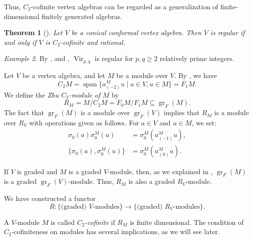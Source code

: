 \documentclass[a4paper, 12pt, reqno]{amsart}
\newtheorem{theorem}{Theorem}[section]
\theoremstyle{remark}
\newtheorem{example}[theorem]{Example}
\DeclareMathOperator{\Vir}{Vir}
\DeclareMathOperator{\gr}{gr}
\DeclareMathOperator{\vspan}{span}
\begin{document}
Thus, $C_2$-cofinite vertex algebras can be regarded as a generalization of finite-dimensional finitely generated algebras.

\begin{theorem}[{\cite[Theorem 4.5]{abe_rationality_2003}}]
  \label{thr:57}
  Let $V$ be a conical conformal vertex algebra.
  Then $V$ is regular if and only if $V$ is $C_2$-cofinite and rational.
\end{theorem}

\begin{example}
  \label{exa:20}
  By ,  and , $\Vir_{p, q}$ is regular for $p, q \ge 2$ relatively prime integers.
\end{example}

Let $V$ be a vertex algebra, and let $M$ be a module over $V$.
By , we have
\begin{equation*}
  C_2M = \vspan\{a^M_{(-2)}u \mid a \in V, u \in M\} = F_1M.
\end{equation*}
We define the \emph{Zhu $C_2$-module of $M$} by
\begin{equation*}
  R_M = M/C_2M = F_0M/F_1M \subseteq \gr_F(M).
\end{equation*}
The fact that $\gr_F(M)$ is a module over $\gr_F(V)$ implies that $R_M$ is a module over $R_V$ with operations given as follows.
For $a \in V$ and $u \in M$, we set:
\begin{align*}
  \sigma_0(a)\sigma^M_0(u) &= \sigma^M_0(a^M_{(-1)}u), \\
  \{\sigma_0(a), \sigma^M_0(u)\} &= \sigma^M_0(a^M_{(0)}u).
\end{align*}

If $V$ is graded and $M$ is a graded $V$-module, then, as we explained in , $\gr_F(M)$ is a graded $\gr_F(V)$-module.
Thus, $R_M$ is also a graded $R_V$-module.

We have constructed a functor
\begin{equation*}
  R: \{\text{(graded) $V$-modules}\} \to \{\text{(graded) $R_V$-modules}\}.
\end{equation*}

A $V$-module $M$ is called \emph{$C_2$-cofinite} if $R_M$ is finite dimensional.
The condition of $C_2$-cofiniteness on modules has several implications, as we will see later.
\end{document}
